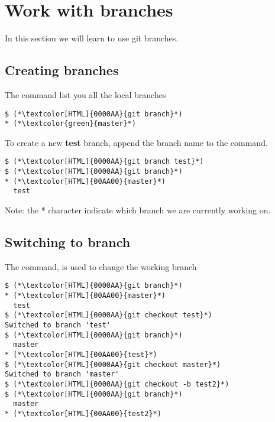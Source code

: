 \section{Work with branches}
\begin{frame}[fragile]
    \slidetitle
In this section we will learn to use git branches.

\end{frame}

\subsection{Creating branches}
\begin{frame}[fragile]
    \subslidetitle
The  command list you all the local branches
\begin{lstlisting}
$ (*\textcolor[HTML]{0000AA}{git branch}*)
* (*\textcolor{green}{master}*)
\end{lstlisting}

To create a new \textbf{test} branch, append the branch name to the command.
\begin{lstlisting}
$ (*\textcolor[HTML]{0000AA}{git branch test}*)
$ (*\textcolor[HTML]{0000AA}{git branch}*)
* (*\textcolor[HTML]{00AA00}{master}*)
  test
\end{lstlisting}

Note: the * character indicate which branch we are currently working on.
\end{frame}

\subsection{Switching to branch}
\begin{frame}[fragile]
    \subslidetitle
The  command, is used to change the working branch
\begin{lstlisting}
$ (*\textcolor[HTML]{0000AA}{git branch}*)
* (*\textcolor[HTML]{00AA00}{master}*)
  test
$ (*\textcolor[HTML]{0000AA}{git checkout test}*)
Switched to branch 'test'
$ (*\textcolor[HTML]{0000AA}{git branch}*)
  master
* (*\textcolor[HTML]{00AA00}{test}*)
$ (*\textcolor[HTML]{0000AA}{git checkout master}*)
Switched to branch 'master'
$ (*\textcolor[HTML]{0000AA}{git checkout -b test2}*)
$ (*\textcolor[HTML]{0000AA}{git branch}*)
  master
* (*\textcolor[HTML]{00AA00}{test2}*)
\end{lstlisting}
\end{frame}

